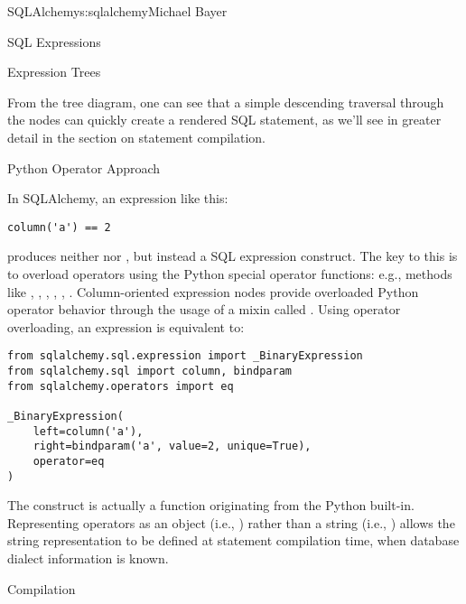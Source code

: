 \begin{aosachapter}{SQLAlchemy}{s:sqlalchemy}{Michael Bayer}
\begin{aosasect1}{SQL Expressions}
\begin{aosasect2}{Expression Trees}

From the tree diagram, one can see that a simple descending traversal through
the nodes can quickly create a rendered SQL statement, as we'll see in greater
detail in the section on statement compilation.

\end{aosasect2}

\begin{aosasect2}{Python Operator Approach}

In SQLAlchemy, an expression like this:

\begin{verbatim}
column('a') == 2
\end{verbatim}

\noindent produces neither  nor , but instead a SQL expression
construct. The key to this is to overload operators using the Python special
operator functions: e.g., methods like , ,
, , , . Column-oriented
expression nodes provide overloaded Python operator behavior through the usage
of a mixin called . Using operator overloading, an
expression  is equivalent to:

\begin{verbatim}
from sqlalchemy.sql.expression import _BinaryExpression
from sqlalchemy.sql import column, bindparam
from sqlalchemy.operators import eq

_BinaryExpression(
    left=column('a'),
    right=bindparam('a', value=2, unique=True),
    operator=eq
)
\end{verbatim}

\noindent The  construct is actually a function originating from the Python
 built-in.  Representing operators as an object (i.e.,
) rather than a string (i.e., \code{=}) allows the string
representation to be defined at statement compilation time, when database
dialect information is known.

\end{aosasect2}

\begin{aosasect2}{Compilation}


\end{aosasect2}
\end{aosasect1}
\end{aosachapter}
